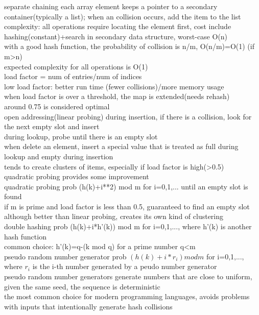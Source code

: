 \scriptsize{separate chaining} {\tiny each array element keeps a pointer to a secondary container(typically a list); when an collision occurs, add the item to the list\\
complexity: all operations require locating the element first, cost include hashing(constant)+search in secondary data structure, worst-case O(n)\\
with a good hash function, the probability of collision is n/m, O(n/m)=O(1) (if m>n)\\
expected complexity for all operations is O(1)
}\\
\scriptsize{load factor} {\tiny = num of entries/num of indices\\
low load factor: better run time (fewer collisions)/more memory usage\\
when load factor is over a threshold, the map is extended(needs rehash)\\
around 0.75 is considered optimal
}\\
\scriptsize{open addressing(linear probing)} {\tiny during insertion, if there is a collision, look for the next empty slot and insert\\
during lookup, probe until there is an empty slot\\
when delete an element, insert a special value that is treated as full during lookup and empty during insertion\\
tends to create clusters of items, especially if load factor is high(>0.5)\\
quadratic probing provides some improvement
}\\
\scriptsize{quadratic probing} {\tiny prob (h(k)+i**2) mod m for i=0,1,... until an empty slot is found\\
if m is prime and load factor is less than 0.5, guaranteed to find an empty slot\\
although better than linear probing, creates its own kind of clustering
}\\
\scriptsize{double hashing} {\tiny prob (h(k)+i*h'(k)) mod m for i=0,1,..., where h'(k) is another hash function\\
common choice: h'(k)=q-(k mod q) for a prime number q<m
}\\
\scriptsize{pseudo random number generator}
{\tiny prob $(h(k)+i*r_i) mod m$ for i=0,1,..., where $r_i$ is the i-th number generated by a peudo number generator\\
pseudo random number generators generate numbers that are close to uniform, given the same seed, the sequence is deterministic\\
the most common choice for modern programming languages, avoids problems with inputs that intentionally generate hash collisions
}\\
